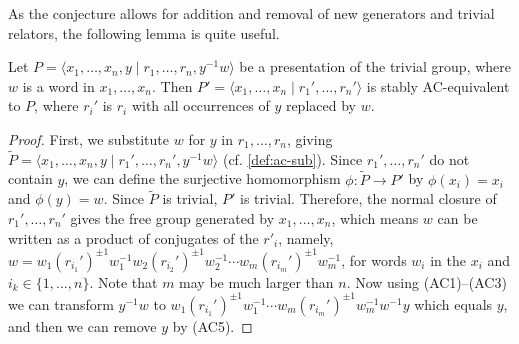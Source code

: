 As the conjecture allows for addition and removal of new generators and trivial relators, the following lemma is quite useful.


\begin{lemma}\label{lem:substitution}
    Let $P=\langle x_1,\ldots, x_n, y \mid r_1,\ldots, r_n, y^{-1}w\rangle$ be a presentation of the trivial group, where $w$ is a word in $x_1,\ldots,x_n$. Then $P'=\langle x_1,\ldots, x_n \mid r_1',\ldots, r_n'\rangle$ is stably AC-equivalent to $P$, where $r_i'$ is $r_i$ with all occurrences of $y$ replaced by $w$.
\end{lemma}
\begin{proof}
    First, we substitute $w$ for $y$ in $r_1,\ldots,r_n$, giving $\widetilde{P}=\langle x_1,\ldots,x_n,y\mid r_1',\ldots,r_n',y^{-1}w\rangle$ (cf. \cref{def:ac-sub}). Since $r_1',\ldots,r_n'$ do not contain $y$, we can define the surjective homomorphism $\phi:\widetilde{P}\longrightarrow P'$ by $\phi(x_i)=x_i$ and $\phi(y)=w$. Since $\widetilde{P}$ is trivial, $P'$ is trivial. Therefore, the normal closure of $r_1',\ldots, r_n'$ gives the free group generated by $x_1,\ldots, x_n$, which means $w$ can be written as a product of conjugates of the $r'_i$, namely, $w=w_1 (r_{i_1}')^{\pm1}w_1^{-1}w_2 (r_{i_2}')^{\pm 1}w_2^{-1}\cdots w_m (r_{i_m}')^{\pm 1}w_m^{-1}$, for words $w_i$ in the $x_i$ and $i_k \in \{1,\ldots,n\}$. Note that $m$ may be much larger than $n$. Now using (AC1)--(AC3) we can transform  $y^{-1}w$ to $w_1 (r_{i_1}')^{\pm1}w_1^{-1}\cdots w_m (r_{i_m}')^{\pm 1}w_m^{-1}w^{-1}y$ which equals $y$, and then we can remove $y$ by (AC5).
\end{proof}


